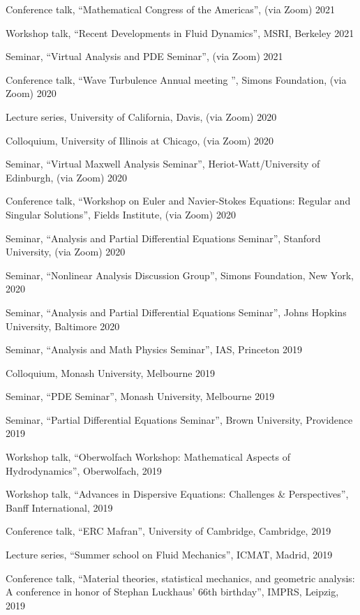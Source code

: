 \documentclass[10pt]{article}
\begin{document}
\begin{list}{}{\leftmargin=1em}
\item Conference talk, ``Mathematical Congress of the Americas'', (via Zoom) 2021
\item Workshop talk, ``Recent Developments in Fluid Dynamics'', MSRI, Berkeley 2021
\item Seminar, ``Virtual Analysis and PDE Seminar'', (via Zoom) 2021
\item Conference talk, ``Wave Turbulence Annual meeting
'', Simons Foundation, (via Zoom) 2020
\item Lecture series, University of California, Davis, (via Zoom) 2020
\item Colloquium, University of Illinois at Chicago, (via Zoom) 2020
\item Seminar,  ``Virtual Maxwell Analysis Seminar'',  Heriot-Watt/University of Edinburgh, (via Zoom) 2020 
\item Conference talk, ``Workshop on Euler and Navier-Stokes Equations: Regular and Singular Solutions'', Fields Institute, (via Zoom) 2020
\item Seminar, ``Analysis and Partial Differential Equations Seminar'', Stanford University, (via Zoom) 2020
\item Seminar, ``Nonlinear Analysis Discussion Group'', Simons Foundation,  New York, 2020
\item Seminar, ``Analysis and Partial Differential Equations Seminar'', Johns Hopkins University, Baltimore 2020
\item Seminar, ``Analysis and Math Physics Seminar'', IAS, Princeton 2019
\item Colloquium, Monash University, Melbourne 2019
\item Seminar, ``PDE Seminar'', Monash University, Melbourne 2019
\item Seminar, ``Partial Differential Equations Seminar'', Brown University, Providence 2019
\item Workshop talk, ``Oberwolfach Workshop: Mathematical Aspects of Hydrodynamics'', Oberwolfach, 2019
\item Workshop talk, ``Advances in Dispersive Equations: Challenges \& Perspectives'', Banff International, 2019
\item Conference talk, ``ERC Mafran'', University of Cambridge, Cambridge, 2019
\item Lecture series, ``Summer school on Fluid Mechanics'', ICMAT, Madrid, 2019
\item Conference talk, ``Material theories, statistical mechanics, and geometric analysis: A conference in honor of Stephan Luckhaus' 66th birthday'', IMPRS, Leipzig, 2019

\end{list}
\end{document}
